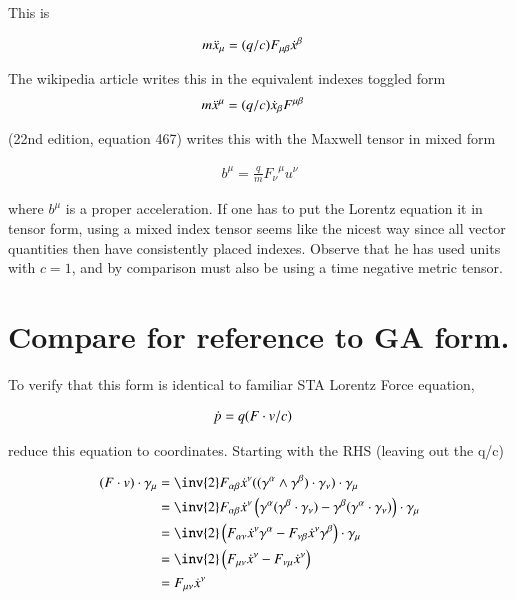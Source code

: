 \documentclass{article}
\begin{document}
This is

\begin{align}\label{eqn:fromLagrangian}
m \ddot{x}_\mu &= (q/c) F_{\mu\beta} \dot{x}^\beta 
\end{align}

The wikipedia article \cite{wikiLorentzForce} writes this in the equivalent indexes toggled form
\begin{align*}
m \ddot{x}^\mu &= (q/c) \dot{x}_\beta F^{\mu\beta}
\end{align*}

\cite{schiller:mm} (22nd edition, equation 467) writes this with the
Maxwell tensor in mixed form

\begin{align*}
b^\mu = \frac{q}{m} {F_\nu}^\mu u^\nu
\end{align*}

where $b^\mu$ is a proper acceleration.  If one has to put the Lorentz 
equation it in tensor
form, using a mixed index tensor seems like the nicest way since all
vector quantities then have consistently placed indexes.  Observe that he has used units with $c=1$, and by comparison must
also be using a time negative metric tensor.

%

\section{ Compare for reference to GA form. }

To verify that this form is identical to familiar STA Lorentz Force equation,

\begin{align}
\dot{p} &= q (F \cdot v/c) 
\end{align}

reduce this equation to coordinates.  Starting with the RHS (leaving out the q/c)

\begin{align*}
(F \cdot v) \cdot \gamma_\mu 
&= \inv{2} F_{\alpha\beta} \xdot^\nu ((\gamma^{\alpha} \wedge \gamma^{\beta}) \cdot \gamma_\nu) \cdot \gamma_\mu \\
&= \inv{2} F_{\alpha\beta} \xdot^\nu \left( \gamma^{\alpha} (\gamma^{\beta} \cdot \gamma_\nu) -\gamma^{\beta} (\gamma^{\alpha} \cdot \gamma_\nu) \right) \cdot \gamma_\mu \\
&= \inv{2} \left( F_{\alpha\nu} \xdot^\nu \gamma^{\alpha} - F_{\nu\beta} \xdot^\nu \gamma^{\beta} \right) \cdot \gamma_\mu \\
&= \inv{2} \left( F_{\mu\nu} \xdot^\nu - F_{\nu\mu} \xdot^\nu \right) \\
&= F_{\mu\nu} \xdot^\nu \\
\end{align*}
\end{document}
